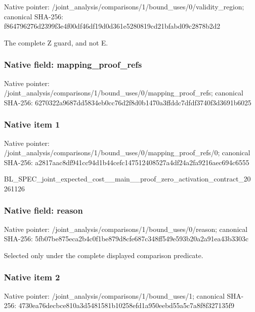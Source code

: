 \documentclass[10pt,a4paper]{article}
\begin{document}
Native pointer: /joint\_analysis/comparis\allowbreak{}ons/1/bound\_uses/0/valid\allowbreak{}ity\_region; canonical SHA-256: f864796276d2399f3e4f00df\allowbreak{}46df19d0d361e5280819cd21\allowbreak{}bfabd09c2878b2d2


The complete Z guard, and not E.


\subsubsection{Native field: mapping\_proof\_refs}


Native pointer: /joint\_analysis/comparis\allowbreak{}ons/1/bound\_uses/0/mappi\allowbreak{}ng\_proof\_refs; canonical SHA-256: 6270322a9687dd5834eb0cc7\allowbreak{}6d2f8d0b1470a3ffddc7dfdf\allowbreak{}3740f3d3691b6025



\subsubsection{Native item 1}


Native pointer: /joint\_analysis/comparis\allowbreak{}ons/1/bound\_uses/0/mappi\allowbreak{}ng\_proof\_refs/0; canonical SHA-256: a2817aac8df941cc94d1b44c\allowbreak{}efc147512408527a4df24a2f\allowbreak{}a9216aec694c6555


BL\_SPEC\_joint\_expected\_c\allowbreak{}ost\_\_main\_\_proof\_zero\_ac\allowbreak{}tivation\_contract\_202611\allowbreak{}26


\subsubsection{Native field: reason}


Native pointer: /joint\_analysis/comparis\allowbreak{}ons/1/bound\_uses/0/reaso\allowbreak{}n; canonical SHA-256: 5fb07be875eca2b4c0f1be87\allowbreak{}9d8cfe687c348ff549e593b2\allowbreak{}0a2a91ea43b3303c


Selected only under the complete displayed comparison predicate.


\subsubsection{Native item 2}


Native pointer: /joint\_analysis/comparis\allowbreak{}ons/1/bound\_uses/1; canonical SHA-256: 4730ea76decbce810a3d5481\allowbreak{}581b10258efd1a950eebd55a\allowbreak{}5c7a8f8f327135f9
\end{document}

